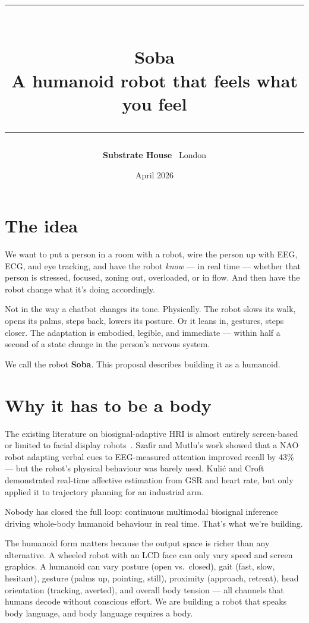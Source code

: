\documentclass[11pt,a4paper]{article}
\title{%
  \textcolor{sub}{\rule{\textwidth}{1.2pt}}\\[0.4cm]
  {\LARGE\bfseries\textcolor{sub}{Soba}}\\[0.1cm]
  {\large\textcolor{sub!60}{A humanoid robot that feels what you feel}}\\[0.3cm]
  \textcolor{sub}{\rule{\textwidth}{1.2pt}}
}
\author{\textbf{Substrate House} \textperiodcentered\ London}
\date{April 2026}
\begin{document}
\maketitle
\thispagestyle{fancy}

\section{The idea}

We want to put a person in a room with a robot, wire the person up with EEG, ECG, and eye tracking, and have the robot \emph{know} --- in real time --- whether that person is stressed, focused, zoning out, overloaded, or in flow. And then have the robot change what it's doing accordingly.

Not in the way a chatbot changes its tone. Physically. The robot slows its walk, opens its palms, steps back, lowers its posture. Or it leans in, gestures, steps closer. The adaptation is embodied, legible, and immediate --- within half a second of a state change in the person's nervous system.

We call the robot \textbf{Soba}. This proposal describes building it as a humanoid.

\section{Why it has to be a body}

The existing literature on biosignal-adaptive HRI is almost entirely screen-based or limited to facial display robots~\cite{szafir2012, kulic2007}. Szafir and Mutlu's work showed that a NAO robot adapting verbal cues to EEG-measured attention improved recall by 43\% --- but the robot's physical behaviour was barely used. Kuli\'{c} and Croft demonstrated real-time affective estimation from GSR and heart rate, but only applied it to trajectory planning for an industrial arm.

Nobody has closed the full loop: continuous multimodal biosignal inference driving whole-body humanoid behaviour in real time. That's what we're building.

The humanoid form matters because the output space is richer than any alternative. A wheeled robot with an LCD face can only vary speed and screen graphics. A humanoid can vary posture (open vs.\ closed), gait (fast, slow, hesitant), gesture (palms up, pointing, still), proximity (approach, retreat), head orientation (tracking, averted), and overall body tension --- all channels that humans decode without conscious effort. We are building a robot that speaks body language, and body language requires a body.
\end{document}
